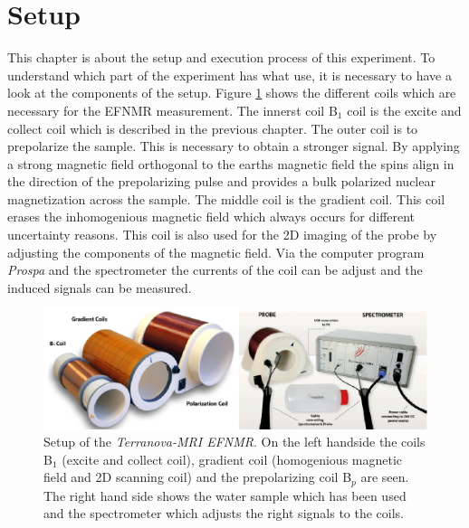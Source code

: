 \section{Setup}
\label{sec:Aufbau}
This chapter is about the setup and execution process of this experiment. To understand which part of the experiment has what use, it is necessary to have a look at the components of the setup.\newline
Figure \ref{fig:Aufbau} shows the different coils which are necessary for the EFNMR measurement. The innerst coil B$_1$ coil is the excite and collect coil which is described in the previous chapter. The outer coil is to prepolarize the sample. This is necessary to obtain a stronger signal. By applying a strong magnetic field orthogonal to the earths magnetic field the spins align in the direction of the prepolarizing pulse and provides a bulk polarized nuclear magnetization across the sample. The middle coil is the gradient coil. This coil erases the inhomogenious magnetic field which always occurs for different uncertainty reasons. This coil is also used for the 2D imaging of the probe by adjusting the components of the magnetic field. Via the computer program \textit{Prospa} and the spectrometer the currents of the coil can be adjust and the induced signals can be measured.
\begin{figure}[H]
    \centering
    \includegraphics[width= \textwidth]{Aufbau.png}   
    \caption[Setup of the \textit{Terranova-MRI EFNMR}. \cite{Bild}]{Setup of the \textit{Terranova-MRI EFNMR}. On the left handside the coils B$_1$ (excite and collect coil), gradient coil (homogenious magnetic field and 2D scanning coil) and the prepolarizing coil B$_p$ are seen. The right hand side shows the water sample which has been used and the spectrometer which adjusts the right signals to the coils. \cite{Bild}}
    \label{fig:Aufbau}
\end{figure}

